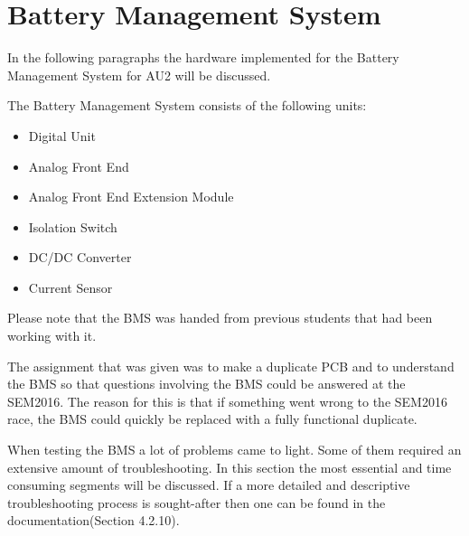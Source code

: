 \section{Battery Management System}
In the following paragraphs the hardware implemented for the Battery Management System for AU2 will be discussed. 

The Battery Management System consists of the following units:
\begin{itemize}
	\item{Digital Unit}
	\item{Analog Front End}
	\item{Analog Front End Extension Module}
	\item{Isolation Switch}
	\item{DC/DC Converter}
	\item{Current Sensor}
\end{itemize}

Please note that the BMS was handed from previous students that had been working with it. 

The assignment that was given was to make a duplicate PCB and to understand the BMS so that questions involving the BMS could be answered at the SEM2016. The reason for this is that if something went wrong to the SEM2016 race, the BMS could quickly be replaced with a fully functional duplicate.

When testing the BMS a lot of problems came to light. Some of them required an extensive amount of troubleshooting. In this section the most essential and time consuming segments will be discussed. If a more detailed and descriptive troubleshooting process is sought-after then one can be found in the documentation\cite{AU2}(Section 4.2.10).

